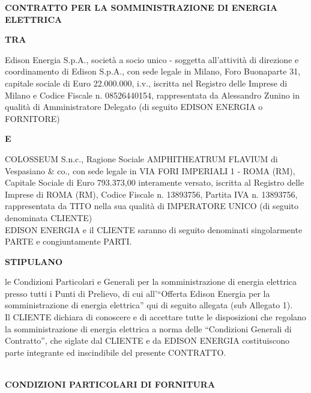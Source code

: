 \documentclass[a4paper,8pt,notitlepage]{article}%
\begin{document}
\begin{center}
	\large \textbf{CONTRATTO PER LA SOMMINISTRAZIONE DI ENERGIA ELETTRICA}
\end{center}

\begin{center}
	\footnotesize \textbf{TRA}
\end{center}

\noindent Edison Energia S.p.A., società a socio unico - soggetta all'attività di direzione e coordinamento di Edison S.p.A., con sede legale in Milano, Foro Buonaparte 31, capitale sociale di Euro 22.000.000, i.v., iscritta nel Registro delle Imprese di Milano e Codice Fiscale n. 08526440154, rappresentata da Alessandro Zunino in qualità di Amministratore Delegato (di seguito EDISON ENERGIA o FORNITORE)

\begin{center}
	\footnotesize \textbf{E}
\end{center}

\noindent COLOSSEUM S.n.c., Ragione Sociale AMPHITHEATRUM FLAVIUM di Vespasiano \& co., con sede legale in VIA FORI IMPERIALI 1 - ROMA (RM), Capitale Sociale di Euro 793.373,00 interamente versato, iscritta al Registro delle Imprese di ROMA (RM), Codice Fiscale n. 13893756, Partita IVA n. 13893756, rappresentata da TITO nella sua qualità di IMPERATORE UNICO (di seguito denominata CLIENTE)\\

\noindent EDISON ENERGIA e il CLIENTE saranno di seguito denominati singolarmente PARTE e congiuntamente PARTI.

\begin{center}
	\footnotesize \textbf{STIPULANO}
\end{center}

\noindent le Condizioni Particolari e Generali per la somministrazione di energia elettrica presso tutti i Punti di Prelievo, di cui all’“Offerta Edison Energia per la somministrazione di energia elettrica” qui di seguito allegata (sub Allegato 1).\\

\noindent Il CLIENTE dichiara di conoscere e di accettare tutte le disposizioni che regolano la somministrazione di energia elettrica a norma delle “Condizioni Generali di Contratto”, che siglate dal CLIENTE e da EDISON ENERGIA costituiscono parte integrante ed inscindibile del presente CONTRATTO.
\\\\
\begin{center}
	\textbf{CONDIZIONI PARTICOLARI DI FORNITURA}
\end{center}
\end{document}
